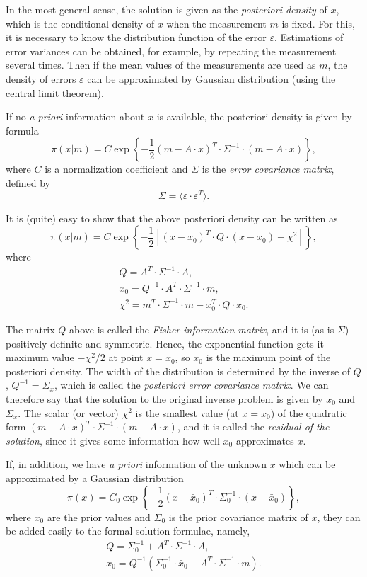 \documentclass[a4paper,twoside]{refrep}
\newcommand{\ve}{\varepsilon}
\begin{document}
In the most general sense, the solution is given as the \emph{posteriori density} of $x$, which is the conditional density of $x$ when the measurement $m$ is fixed. For this, it is necessary to know the distribution function of the error $\ve$. Estimations of error variances can be obtained, for example, by repeating the measurement several times. Then if the mean values of the measurements are used as $m$, the density of errors $\ve$ can be approximated by Gaussian distribution (using the central limit theorem). 

If no \emph{a priori} information about $x$ is available, the posteriori density is given by formula
\[
\pi(x|m) = C \exp\left\{-\frac{1}{2}\left(m - A\cdot x\right)^{T}
\cdot\Sigma^{-1}\cdot\left(m - A\cdot x\right)\right\},
\]
where $C$ is a normalization coefficient and $\Sigma$ is the \emph{error covariance matrix}, defined by
\[
\Sigma = \langle \ve\cdot\ve^{T} \rangle.
\]

It is (quite) easy to show that the above posteriori density can be written as
\[
\pi(x|m) = C\exp\left\{-\frac{1}{2}\left[
(x-x_0)^{T}\cdot Q \cdot (x-x_0) + \chi^2 \right]\right\},
\]
where
\begin{gather*}
Q = A^T \cdot \Sigma^{-1}\cdot A,\\
x_0 = Q^{-1}\cdot A^{T}\cdot\Sigma^{-1}\cdot m,\\
\chi^2 = m^{T}\cdot\Sigma^{-1}\cdot m - x_0^{T}\cdot Q\cdot x_0.
\end{gather*}

The matrix $Q$ above is called the \emph{Fisher information matrix}, and it is (as is $\Sigma$) positively definite and symmetric. Hence, the exponential function gets it maximum value $-\chi^2 /2$ at point $x=x_0$, so $x_0$ is the maximum point of the posteriori density. The width of the distribution is determined by the inverse of $Q$, $Q^{-1}=\Sigma_{x}$, which is called the \emph{posteriori error covariance matrix}. We can therefore say that the solution to the original inverse problem is given by $x_0$ and $\Sigma_{x}$. The scalar (or vector) $\chi^2$ is the smallest value (at $x=x_0$) of the quadratic form $(m-A\cdot x)^T\cdot\Sigma^{-1}\cdot(m-A\cdot x)$, and it is called the \emph{residual of the solution}, since it gives some information how well $x_0$ approximates $x$.

If, in addition, we have \emph{a priori} information of the unknown $x$ which can be approximated by a Gaussian distribution
\[
\pi(x) = C_0 \exp\left\{ -\frac{1}{2}(x-\bar{x}_0)^T\cdot \Sigma_0^{-1}\cdot (x-\bar{x}_0)\right\},
\]
where $\bar{x}_0$ are the prior values and $\Sigma_0$ is the prior covariance matrix of $x$, they can be added easily to the formal solution formulae, namely,
\begin{gather*}
Q = \Sigma_0^{-1} + A^T\cdot \Sigma^{-1} \cdot A,\\
x_0 = Q^{-1}\left( \Sigma_0^{-1}\cdot\bar{x}_0 + A^T\cdot \Sigma^{-1}\cdot m\right).
\end{gather*}
\end{document}
